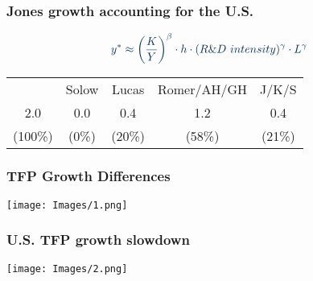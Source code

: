 \documentclass[serif,professionalfont,red,aspectratio=169]{beamer}
\begin{document}
\begin{frame}[t]
\frametitle{Jones growth accounting for the U.S.}
\begin{align*}
    \textcolor{blues}{y^\ast\approx \left(\dfrac{K}{Y}\right)^\beta \cdot h\cdot (R\&D \ intensity)^\gamma \cdot L^\gamma}
\end{align*}
\begin{table}
\centering
    \begin{tabular}{c c c c c}
    & \textcolor{greens}{Solow} & \textcolor{greens}{Lucas} & \textcolor{greens}{Romer/AH/GH} & \textcolor{greens}{J/K/S}\\
    2.0& 0.0 & 0.4 & 1.2 & 0.4\\
    (100\%)& (0\%)& (20\%)&(58\%)&(21\%)
    \end{tabular}
\end{table}
\end{frame}
\begin{frame}[t]
\frametitle{TFP Growth Differences}
\begin{center}
\texttt{[image: Images/1.png]}
\end{center}
\end{frame}

\begin{frame}[t]
\frametitle{U.S. TFP growth slowdown}
\begin{center}
\texttt{[image: Images/2.png]}
\end{center}
\end{frame}
\end{document}

